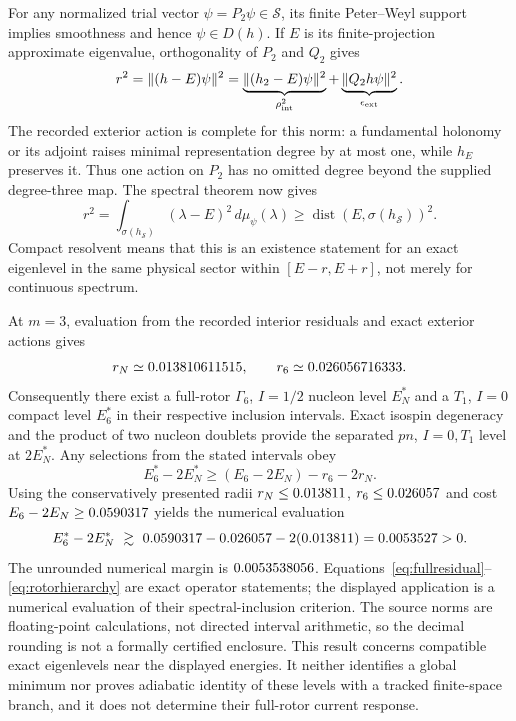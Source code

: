 \documentclass[11pt]{article}
\newcommand{\Ga}{\Gamma}
\begin{document}
For any normalized trial vector $\psi=P_2\psi\in\mathcal S$, its finite Peter--Weyl support implies smoothness and hence $\psi\in D(h)$. If $E$ is its finite-projection approximate eigenvalue, orthogonality of $P_2$ and $Q_2$ gives
\begin{equation}
 r^2=\|(h-E)\psi\|^2
 =\underbrace{\|(h_2-E)\psi\|^2}_{\rho_{\rm int}^2}
  +\underbrace{\|Q_2h\psi\|^2}_{\epsilon_{\rm ext}}.
 \label{eq:fullresidual}
\end{equation}
The recorded exterior action is complete for this norm: a fundamental holonomy or its adjoint raises minimal representation degree by at most one, while $h_E$ preserves it. Thus one action on $P_2$ has no omitted degree beyond the supplied degree-three map. The spectral theorem now gives
\begin{equation}
 r^2=\int_{\sigma(h_{\mathcal S})}(\lambda-E)^2\,d\mu_\psi(\lambda)
 \geq\operatorname{dist}\!\left(E,\sigma(h_{\mathcal S})\right)^2.
 \label{eq:inclusion}
\end{equation}
Compact resolvent means that this is an existence statement for an exact eigenlevel in the same physical sector within $[E-r,E+r]$, not merely for continuous spectrum.

At $m=3$, evaluation from the recorded interior residuals and exact exterior actions gives
\begin{equation}
 r_N\simeq0.013810611515,\qquad r_6\simeq0.026056716333.
\end{equation}
Consequently there exist a full-rotor $\Ga_6$, $I=1/2$ nucleon level $E_N^*$ and a $T_1$, $I=0$ compact level $E_6^*$ in their respective inclusion intervals. Exact isospin degeneracy and the product of two nucleon doublets provide the separated $pn$, $I=0,T_1$ level at $2E_N^*$. Any selections from the stated intervals obey
\begin{equation}
 E_6^*-2E_N^*\geq(E_6-2E_N)-r_6-2r_N.
 \label{eq:rotorhierarchy}
\end{equation}
Using the conservatively presented radii $r_N\leq0.013811$, $r_6\leq0.026057$ and cost $E_6-2E_N\geq0.0590317$ yields the numerical evaluation
\begin{equation}
 E_6^*-2E_N^*\ \gtrsim\
 0.0590317-0.026057-2(0.013811)
 =0.0053527>0.
 \label{eq:rotormargin}
\end{equation}
The unrounded numerical margin is $0.0053538056$. Equations~\eqref{eq:fullresidual}--\eqref{eq:rotorhierarchy} are exact operator statements; the displayed application is a numerical evaluation of their spectral-inclusion criterion. The source norms are floating-point calculations, not directed interval arithmetic, so the decimal rounding is not a formally certified enclosure. This result concerns compatible exact eigenlevels near the displayed energies. It neither identifies a global minimum nor proves adiabatic identity of these levels with a tracked finite-space branch, and it does not determine their full-rotor current response.
\end{document}

